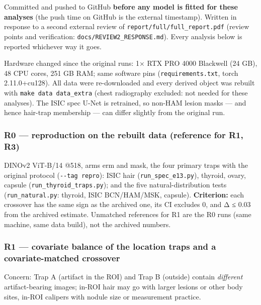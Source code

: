 {\small
Committed and pushed to GitHub \textbf{before any model is fitted for these analyses} (the push time on GitHub is the
external timestamp). Written in response to a second external review of \texttt{report/full/full\_report.pdf}
(review points and verification: \texttt{docs/REVIEW2\_RESPONSE.md}). Every analysis below is reported whichever way it goes.

Hardware changed since the original runs: 1× RTX PRO 4000 Blackwell (24 GB), 48 CPU cores, 251 GB RAM; same
software pins (\texttt{requirements.txt}, torch 2.11.0+cu128). All data were re-downloaded and every derived object was
rebuilt with \texttt{make\ data\ data\_extra} (chest radiography excluded: not needed for these analyses). The ISIC spec U-Net
is retrained, so non-HAM lesion masks --- and hence hair-trap membership --- can differ slightly from the original run.

\subsubsection{R0 --- reproduction on the rebuilt data (reference for R1, R3)}\label{r0--reproduction-on-the-rebuilt-data-reference-for-r1-r3}

DINOv2 ViT-B/14 @518, arms erm and mask, the four primary traps with the original protocol (\texttt{-\/-tag\ repro}):
ISIC hair (\texttt{run\_spec\_e13.py}), thyroid, ovary, capsule (\texttt{run\_thyroid\_traps.py}); and the five natural-distribution
tests (\texttt{run\_natural.py}: thyroid, ISIC BCN/HAM/MSK, capsule). \textbf{Criterion:} each crossover has the same sign as the
archived one, its CI excludes 0, and \textbar Δ\textbar{} ≤ 0.03 from the archived estimate. Unmatched references for R1 are the R0
runs (same machine, same data build), not the archived numbers.

\subsubsection{R1 --- covariate balance of the location traps and a covariate-matched crossover}\label{r1--covariate-balance-of-the-location-traps-and-a-covariate-matched-crossover}

Concern: Trap A (artifact in the ROI) and Trap B (outside) contain \emph{different} artifact-bearing images; in-ROI hair
may go with larger lesions or other body sites, in-ROI calipers with nodule size or measurement practice.

}
